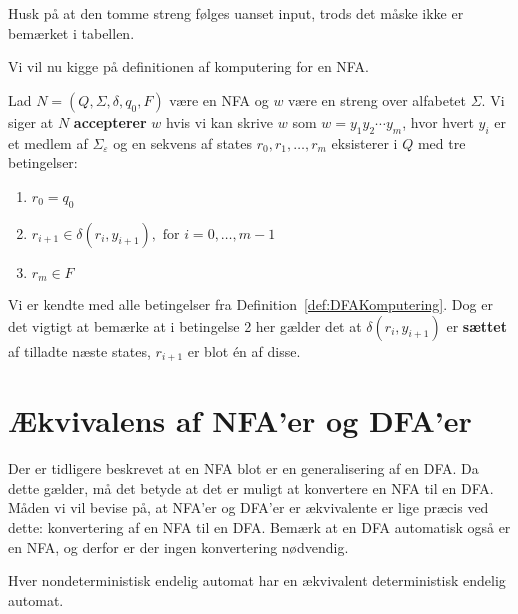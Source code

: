Husk på at den tomme streng følges uanset input, trods det måske ikke er bemærket i tabellen.

Vi vil nu kigge på definitionen af komputering for en NFA.

\begin{definition}
  \label{def:NFAKomputering}
  Lad $N = (Q, \Sigma, \delta, q_{0}, F)$ være en NFA og $w$ være en streng over alfabetet $\Sigma$. Vi siger at $N$ \textbf{accepterer} $w$ hvis vi kan skrive $w$ som $w = y_{1}y_{2} \cdots y_{m}$, hvor hvert $y_{i}$ er et medlem af $\Sigma_{\varepsilon}$ og en sekvens af states $r_{0}, r_{1}, \ldots, r_{m}$ eksisterer i $Q$ med tre betingelser:
  \begin{enumerate}
    \item $r_{0} = q_{0}$
    \item $r_{i+1} \in \delta(r_{i}, y_{i+1}), \text{ for } i = 0, \ldots, m - 1$
          \item $r_{m} \in F$
  \end{enumerate}
\end{definition}
  Vi er kendte med alle betingelser fra Definition~\ref{def:DFAKomputering}. Dog er det vigtigt at bemærke at i betingelse 2 her gælder det at $\delta(r_{i}, y_{i+1})$ er \textbf{sættet} af tilladte næste states, $r_{i+1}$ er blot én af disse.

\newpage
\section{Ækvivalens af NFA'er og DFA'er}
Der er tidligere beskrevet at en NFA blot er en generalisering af en DFA. Da dette gælder, må det betyde at det er muligt at konvertere en NFA til en DFA. Måden vi vil bevise på, at NFA'er og DFA'er er ækvivalente er lige præcis ved dette: konvertering af en NFA til en DFA. Bemærk at en DFA automatisk også er en NFA, og derfor er der ingen konvertering nødvendig.

\begin{theorem}
Hver nondeterministisk endelig automat har en ækvivalent deterministisk endelig automat.
\end{theorem}

